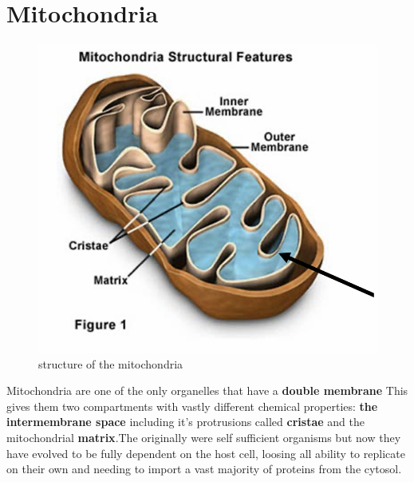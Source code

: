 \documentclass[../main.tex]{subfiles}
\begin{document}
\section{Mitochondria}
\begin{figure}[H]
    \centering
    \includegraphics[width=0.5\linewidth]{mitochondria1.png}
    \caption{structure of the mitochondria}
    \label{fig:enter-label}
\end{figure}
Mitochondria are one of the only organelles that have a \textbf{double membrane} This gives them two compartments with vastly different chemical properties: \textbf{the intermembrane space} including it's protrusions called \textbf{\gls{cristae}} and the mitochondrial \textbf{matrix}.The originally were self sufficient organisms but now they have evolved to be fully dependent on the host cell, loosing all ability to replicate on their own and needing to import a vast majority of proteins from the cytosol.
\end{document}
